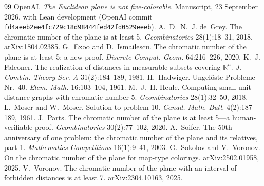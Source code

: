 \documentclass[11pt]{article}
\theoremstyle{definition}
\theoremstyle{remark}
\newcommand{\R}{\mathbb{R}}
\begin{document}
\begin{thebibliography}{99}
 OpenAI. \emph{The Euclidean plane is not five-colorable.} Manuscript, 23 September 2026, with Lean development (OpenAI commit \texttt{fd4aeeb2ee4fc729c18d98444fed42fd0529eeeb}).
 A.~D.~N.~J. de~Grey. The chromatic number of the plane is at least 5. \emph{Geombinatorics} 28(1):18--31, 2018. arXiv:1804.02385.
 G.~Exoo and D.~Ismailescu. The chromatic number of the plane is at least 5: a new proof. \emph{Discrete Comput. Geom.} 64:216--226, 2020.
 K.~J. Falconer. The realization of distances in measurable subsets covering $\R^n$. \emph{J. Combin. Theory Ser. A} 31(2):184--189, 1981.
 H.~Hadwiger. Ungel\"oste Probleme Nr.~40. \emph{Elem. Math.} 16:103--104, 1961.
 M.~J.~H. Heule. Computing small unit-distance graphs with chromatic number 5. \emph{Geombinatorics} 28(1):32--50, 2018.
 L.~Moser and W.~Moser. Solution to problem 10. \emph{Canad. Math. Bull.} 4(2):187--189, 1961.
 J.~Parts. The chromatic number of the plane is at least 5---a human-verifiable proof. \emph{Geombinatorics} 30(2):77--102, 2020.
 A.~Soifer. The 50th anniversary of one problem: the chromatic number of the plane and its relatives, part 1. \emph{Mathematics Competitions} 16(1):9--41, 2003.
 G.~Sokolov and V.~Voronov. On the chromatic number of the plane for map-type colorings. arXiv:2502.01958, 2025.
 V.~Voronov. The chromatic number of the plane with an interval of forbidden distances is at least 7. arXiv:2304.10163, 2025.
\end{thebibliography}
\end{document}

